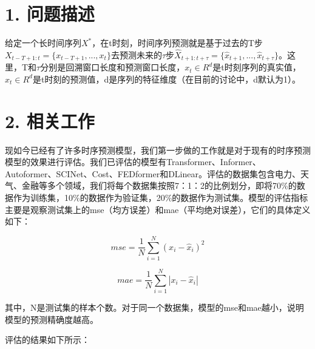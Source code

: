 \documentclass[twoside,a4paper]{article}
\begin{document}
\pagestyle{fancy}
\fancyhead{}

\section*{1. 问题描述}
给定一个长时间序列$X^{*}$，在t时刻，时间序列预测就是基于过去的T步$X_{t-T+1:t} = \{ x_{t - T + 1},...,x_{t} \} $去预测未来的$\tau$步$\hat{X}_{t+1:t+\tau} = \{ \hat{x}_{t + 1},...,\hat{x}_{t + \tau} \} $。这里，T和$\tau$分别是回溯窗口长度和预测窗口长度，$x_{t} \in R^d$是t时刻序列的真实值，$\hat{x}_{t} \in R^d$是t时刻的预测值，d是序列的特征维度（在目前的讨论中，d默认为1）。

\section*{2. 相关工作}
现如今已经有了许多时序预测模型，我们第一步做的工作就是对于现有的时序预测模型的效果进行评估。我们已评估的模型有Transformer、Informer、Autoformer、SCINet、Cost、FEDformer和DLinear。评估的数据集包含电力、天气、金融等多个领域，我们将每个数据集按照7：1：2的比例划分，即将70\%的数据作为训练集，10\%的数据作为验证集，20\%的数据作为测试集。模型的评估指标主要是观察测试集上的mse（均方误差）和mae（平均绝对误差），它们的具体定义如下：

\begin{equation}
    mse = \frac{1}{N} \sum_{i=1}^{N} ( x_{i} - \hat{x}_{i} )^2
\end{equation}

\begin{equation}
    mae = \frac{1}{N} \sum_{i=1}^{N} | x_{i} - \hat{x}_{i} |
\end{equation}

\noindent 其中，N是测试集的样本个数。对于同一个数据集，模型的mse和mae越小，说明模型的预测精确度越高。\par

评估的结果如下所示：\par
\end{document}
